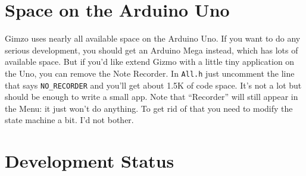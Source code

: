 \documentclass{article}
\begin{document}
\section{Space on the Arduino Uno}
Gimzo uses nearly all available space on the Arduino Uno.  If you want to do any serious development, you should get an Arduino Mega instead, which has lots of available space.  But if you'd like extend Gizmo with a little tiny application on the Uno, you can remove the Note Recorder.  In \texttt{All.h} just uncomment the line that says \texttt{NO\_RECORDER} and you'll get about 1.5K of code space.  It's not a lot but should be enough to write a small app. Note that ``Recorder'' will still appear in the Menu: it just won't do anything.  To get rid of that you need to modify the state machine a bit.  I'd not bother.

\section{Development Status}
\end{document}
